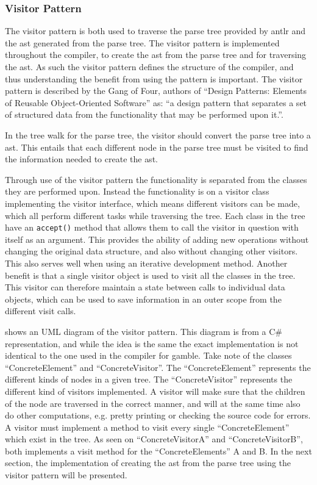 \subsubsection*{Visitor Pattern}\label{subs:visit}
The visitor pattern is both used to traverse the parse tree provided by \gls{antlr} and the \acrshort{ast} generated from the parse tree.
The visitor pattern is implemented throughout the compiler, to create the \acrshort{ast} from the parse tree and for traversing the \acrshort{ast}.
As such the visitor pattern defines the structure of the compiler, and thus understanding the benefit from using the pattern is important.
The visitor pattern is described by the Gang of Four, authors of ``Design Patterns: Elements of Reusable Object-Oriented Software'' as:
``a design pattern that separates a set of structured data from the functionality that may be performed upon it.''. \citep{GOF}

In the tree walk for the parse tree, the visitor should convert the parse tree into a \acrshort{ast}.
This entails that each different node in the parse tree must be visited to find the information needed to create the \acrshort{ast}.

Through use of the visitor pattern the functionality is separated from the classes they are performed upon. 
Instead the functionality is on a visitor class implementing the visitor interface, which means different visitors can be made, which all perform different tasks while traversing the tree. 
Each class in the tree have an \texttt{accept()} method that allows them to call the visitor in question with itself as an argument.
This provides the ability of adding new operations without changing the original data structure, and also without changing other visitors.
This also serves well when using an iterative development method.
Another benefit is that a single visitor object is used to visit all the classes in the tree.
This visitor can therefore maintain a state between calls to individual data objects, which can be used to save information in an outer scope from the different visit calls.

 shows an UML diagram of the visitor pattern.
This diagram is from a C\# representation, and while the idea is the same the exact implementation is not identical to the one used in the compiler for \gls{gamble}.
Take note of the classes ``ConcreteElement'' and ``ConcreteVisitor''.
The ``ConcreteElement'' represents the different kinds of nodes in a given tree.
The ``ConcreteVisitor'' represents the different kind of visitors implemented.
A visitor will make sure that the children of the node are traversed in the correct manner, and will at the same time also do other computations, e.g. pretty printing or checking the source code for errors.
A visitor must implement a method to visit every single ``ConcreteElement'' which exist in the tree.
As seen on  ``ConcreteVisitorA'' and ``ConcreteVisitorB'', both implements a visit method for the ``ConcreteElements'' A and B.
In the next section, the implementation of creating the \acrshort{ast} from the parse tree using the visitor pattern will be presented.

